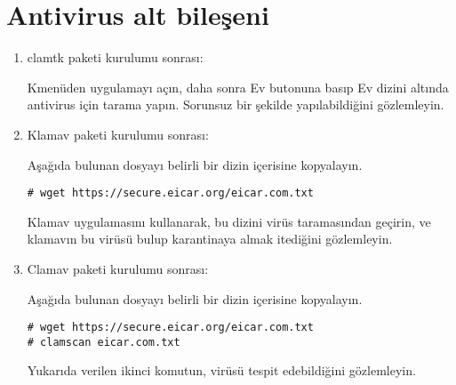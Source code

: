 \documentclass[a4paper,10pt]{article}
\begin{document}
\section{Antivirus alt bileşeni}
\begin{enumerate}
\item clamtk paketi kurulumu sonrası:

Kmenüden uygulamayı açın, daha sonra Ev butonuna basıp Ev dizini altında antivirus için tarama yapın.
Sorunsuz bir şekilde yapılabildiğini gözlemleyin.

\item Klamav paketi kurulumu sonrası:

Aşağıda bulunan dosyayı belirli bir dizin içerisine kopyalayın. 
\begin{verbatim}
# wget https://secure.eicar.org/eicar.com.txt
\end{verbatim}

Klamav uygulamasını kullanarak, bu dizini virüs taramasından geçirin, ve klamavın bu virüsü bulup karantinaya almak itediğini gözlemleyin.

\item Clamav paketi kurulumu sonrası:

Aşağıda bulunan dosyayı belirli bir dizin içerisine kopyalayın. 
\begin{verbatim}
# wget https://secure.eicar.org/eicar.com.txt
# clamscan eicar.com.txt
\end{verbatim}

Yukarıda verilen ikinci komutun, virüsü tespit edebildiğini gözlemleyin.

\end{enumerate}
\end{document}
